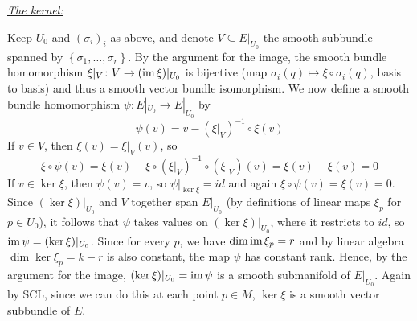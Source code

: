 \documentclass[a4paper, 12pt]{article}
\begin{document}
\begin{Exercise}
\begin{itemize}
            \underline{\emph{The kernel:}}

            Keep $U_0$ and $(\sigma_i)_i$ as above, and denote $V \subseteq E|_{U_0}$ the smooth subbundle spanned by $\left\{ \sigma_1,\dots,\sigma_r \right\}$.
            By the argument for the image, the smooth bundle homomorphism $\xi|_V \colon V \to (\operatorname{im}\xi)|_{U_0}$ is bijective (map $\sigma_i(q) \mapsto \xi\circ\sigma_i(q)$, basis to basis) and thus a smooth vector bundle isomorphism.
            We now define a smooth bundle homomorphism $\psi \colon E|_{U_0} \to E|_{U_0}$ by
            \[
                \psi(v) = v - (\xi|_V)^{-1}\circ\xi(v)
            \]
            If $v \in V$, then $\xi(v) = \xi|_V(v)$, so
            \[
                \xi\circ\psi(v) = \xi(v) - \xi\circ(\xi|_V)^{-1}\circ(\xi|_V)(v) = \xi(v) - \xi(v) = 0
            \]
            If $v \in \ker\xi$, then $\psi(v) = v$, so $\psi|_{\ker\xi} = id$ and again $\xi\circ\psi(v) = \xi(v) = 0$.
            Since $(\ker\xi)|_{U_0}$ and $V$ together span $E|_{U_0}$ (by definitions of linear maps $\xi_p$ for $p \in U_0$),
            it follows that $\psi$ takes values on $(\ker\xi)|_{U_0}$, where it restricts to $id$, so $\operatorname{im}\psi = (\ker\xi)|_{U_0}$.
            Since for every $p$, we have $\dim\operatorname{im}\xi_p = r$ and by linear algebra $\dim\ker\xi_p = k - r$ is also constant,
            the map $\psi$ has constant rank.
            Hence, by the argument for the image, $(\ker\xi)|_{U_0} = \operatorname{im}\psi$ is a smooth submanifold of $E|_{U_0}$.
            Again by SCL, since we can do this at each point $p \in M$, $\ker\xi$ is a smooth vector subbundle of $E$.
    \end{itemize}
\end{Exercise}
\end{document}
